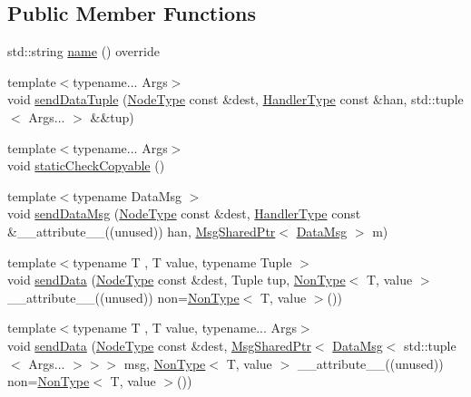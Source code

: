 \subsection*{Public Member Functions}
\begin{DoxyCompactItemize}
\item 
std\+::string \hyperlink{structvt_1_1param_1_1_param_a848380f8509c11b8bffcf0724af77127}{name} () override
\item 
{\footnotesize template$<$typename... Args$>$ }\\void \hyperlink{structvt_1_1param_1_1_param_ac12a098c0d64dcd483cdb590874e45ca}{send\+Data\+Tuple} (\hyperlink{namespacevt_a866da9d0efc19c0a1ce79e9e492f47e2}{Node\+Type} const \&dest, \hyperlink{namespacevt_af64846b57dfcaf104da3ef6967917573}{Handler\+Type} const \&han, std\+::tuple$<$ Args... $>$ \&\&tup)
\item 
{\footnotesize template$<$typename... Args$>$ }\\void \hyperlink{structvt_1_1param_1_1_param_a8d670f74eb5f0a1b5ea312e8b174b648}{static\+Check\+Copyable} ()
\item 
{\footnotesize template$<$typename Data\+Msg $>$ }\\void \hyperlink{structvt_1_1param_1_1_param_acad0af6824812d028e5e0f088b4757dd}{send\+Data\+Msg} (\hyperlink{namespacevt_a866da9d0efc19c0a1ce79e9e492f47e2}{Node\+Type} const \&dest, \hyperlink{namespacevt_af64846b57dfcaf104da3ef6967917573}{Handler\+Type} const \&\+\_\+\+\_\+attribute\+\_\+\+\_\+((unused)) han, \hyperlink{namespacevt_ab2b3d506ec8e8d1540aede826d84a239}{Msg\+Shared\+Ptr}$<$ \hyperlink{structvt_1_1param_1_1_data_msg}{Data\+Msg} $>$ m)
\item 
{\footnotesize template$<$typename T , T value, typename Tuple $>$ }\\void \hyperlink{structvt_1_1param_1_1_param_a6b2fedacd76ee622efdb14038b0d82fe}{send\+Data} (\hyperlink{namespacevt_a866da9d0efc19c0a1ce79e9e492f47e2}{Node\+Type} const \&dest, Tuple tup, \hyperlink{structvt_1_1param_1_1_non_type}{Non\+Type}$<$ T, value $>$ \+\_\+\+\_\+attribute\+\_\+\+\_\+((unused)) non=\hyperlink{structvt_1_1param_1_1_non_type}{Non\+Type}$<$ T, value $>$())
\item 
{\footnotesize template$<$typename T , T value, typename... Args$>$ }\\void \hyperlink{structvt_1_1param_1_1_param_af0791eb37c18d175bdcce5e2f2384427}{send\+Data} (\hyperlink{namespacevt_a866da9d0efc19c0a1ce79e9e492f47e2}{Node\+Type} const \&dest, \hyperlink{namespacevt_ab2b3d506ec8e8d1540aede826d84a239}{Msg\+Shared\+Ptr}$<$ \hyperlink{structvt_1_1param_1_1_data_msg}{Data\+Msg}$<$ std\+::tuple$<$ Args... $>$$>$$>$ msg, \hyperlink{structvt_1_1param_1_1_non_type}{Non\+Type}$<$ T, value $>$ \+\_\+\+\_\+attribute\+\_\+\+\_\+((unused)) non=\hyperlink{structvt_1_1param_1_1_non_type}{Non\+Type}$<$ T, value $>$())

\end{DoxyCompactItemize}
